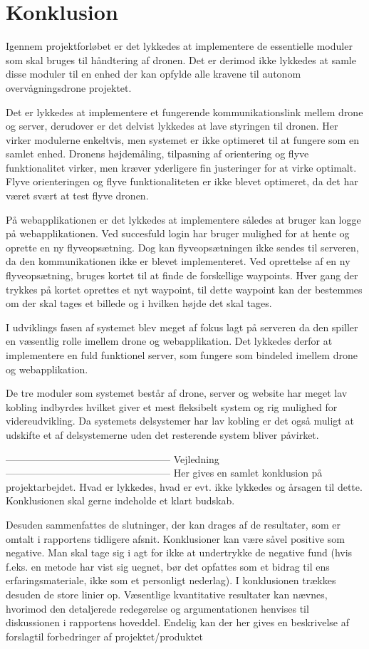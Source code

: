 \section{Konklusion}
Igennem projektforløbet er det lykkedes at implementere de essentielle moduler som skal bruges til håndtering af dronen. Det er derimod ikke lykkedes at samle disse moduler til en enhed der kan opfylde alle kravene til autonom overvågningsdrone projektet. 

Det er lykkedes at implementere et fungerende kommunikationslink mellem drone og server, derudover er det delvist lykkedes at lave styringen til dronen. Her virker modulerne enkeltvis, men systemet er ikke optimeret til at fungere som en samlet enhed. Dronens højdemåling, tilpasning af orientering og flyve funktionalitet virker, men kræver yderligere fin justeringer for at virke optimalt.
Flyve orienteringen og flyve funktionaliteten er ikke blevet optimeret, da det har været svært at test flyve dronen. 

På webapplikationen er det lykkedes at implementere således at bruger kan logge på webapplikationen. Ved succesfuld login har bruger mulighed for at hente og oprette en ny flyveopsætning. Dog kan flyveopsætningen ikke sendes til serveren, da den kommunikationen ikke er blevet implementeret. Ved oprettelse af en ny flyveopsætning, bruges kortet til at finde de forskellige waypoints. Hver gang der trykkes på kortet oprettes et nyt waypoint, til dette waypoint kan der bestemmes om der skal tages et billede og i hvilken højde det skal tages.

I udviklings fasen af systemet blev meget af fokus lagt på serveren da den spiller en væsentlig rolle imellem drone og webapplikation. Det lykkedes derfor at implementere en fuld funktionel server, som fungere som bindeled imellem drone og webapplikation.  

De tre moduler som systemet består af drone, server og website har meget lav kobling indbyrdes hvilket giver et mest fleksibelt system og rig mulighed for videreudvikling. Da systemets delsystemer har lav kobling er det også muligt at udskifte et af delsystemerne uden det resterende system bliver påvirket.

-------------------------------------------------- Vejledning --------------------------------------------------
Her gives en samlet konklusion på projektarbejdet. Hvad er lykkedes, hvad er evt. ikke 
lykkedes og årsagen til dette. Konklusionen skal gerne indeholde et klart budskab. 

Desuden sammenfattes de slutninger, der kan drages af de resultater, som er omtalt i rapportens tidligere afsnit. Konklusioner kan være såvel positive som negative. Man skal 
tage sig i agt for ikke at undertrykke de negative fund (hvis f.eks. en metode har vist sig 
uegnet, bør det opfattes som et bidrag til ens erfaringsmateriale, ikke som et personligt 
nederlag). 
I konklusionen trækkes desuden de store linier op. Væsentlige kvantitative resultater kan 
nævnes, hvorimod den detaljerede redegørelse og argumentationen henvises til diskussionen i rapportens hoveddel. 
Endelig kan der her gives en beskrivelse af forslagtil forbedringer af projektet/produktet
